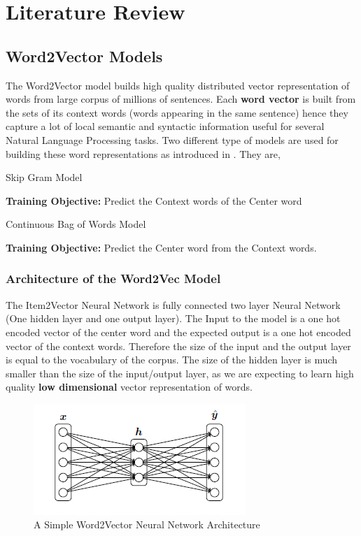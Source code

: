 \chapter{Literature Review}
\label{cha:0}
\lipsum[79]

\section{Word2Vector Models}
The Word2Vector model builds high quality distributed vector representation of words from large corpus of millions of sentences. Each \textbf{word vector} is built from the sets of its context words (words appearing in the same sentence) hence they capture a lot of local semantic and syntactic information useful for several Natural Language Processing tasks. Two different type of models are used for building these word representations as introduced in \cite{Mikolov2013}. They are,
\begin{myitemize}
\item Skip Gram Model
    \begin{myitemize}
    \item \textbf{Training Objective:} Predict the Context words of the Center word
    \end{myitemize}
\item Continuous Bag of Words Model
\begin{myitemize}
    \item \textbf{Training Objective:} Predict the Center word from the Context words. 
    \end{myitemize}
\end{myitemize}

\subsection{Architecture of the Word2Vec Model}
The Item2Vector Neural Network is fully connected two layer Neural Network (One hidden layer and one output layer). The Input to the model is a one hot encoded vector of the center word and the expected output is a one hot encoded vector of the context words. Therefore the size of the input and the output layer is equal to the vocabulary of the corpus. The size of the hidden layer is much smaller than the size of the input/output layer, as we are expecting to learn high quality \textbf{low dimensional} vector representation of words.

\begin{figure}
  \centering
  \includegraphics{2_1_NN_Architecture}
  \caption{A Simple Word2Vector Neural Network Architecture}
  \label{fig:1_1_NN_Architecture}
\end{figure}

